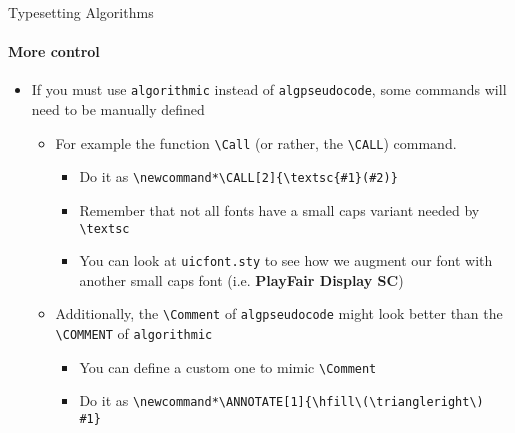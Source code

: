 \documentclass{beamer}
\begin{document}
\begin{frame}[fragile]{Typesetting Algorithms}
\framesubtitle{More control}
\begin{itemize}
    \item If you must use \texttt{algorithmic} instead of \texttt{algpseudocode}, some commands will need to be manually defined
    \begin{itemize}
        \item For example the function \verb|\Call| (or rather, the \verb|\CALL|) command.
        \begin{itemize}
            \item Do it as \verb|\newcommand*\CALL[2]{\textsc{#1}(#2)}|
            \item Remember that not all fonts have a small caps variant needed by \verb|\textsc|
            \item You can look at \texttt{uicfont.sty} to see how we augment our font with another small caps font (i.e. \textbf{PlayFair Display SC})
        \end{itemize}
        \item Additionally, the \verb|\Comment| of \texttt{algpseudocode} might look better than the \verb|\COMMENT| of \texttt{algorithmic}
        \begin{itemize}
            \item You can define a custom one to mimic \verb|\Comment|
            \item Do it as \verb|\newcommand*\ANNOTATE[1]{\hfill\(\triangleright\) #1}|
        \end{itemize}
    \end{itemize}
\end{itemize}
\end{frame}
\end{document}
